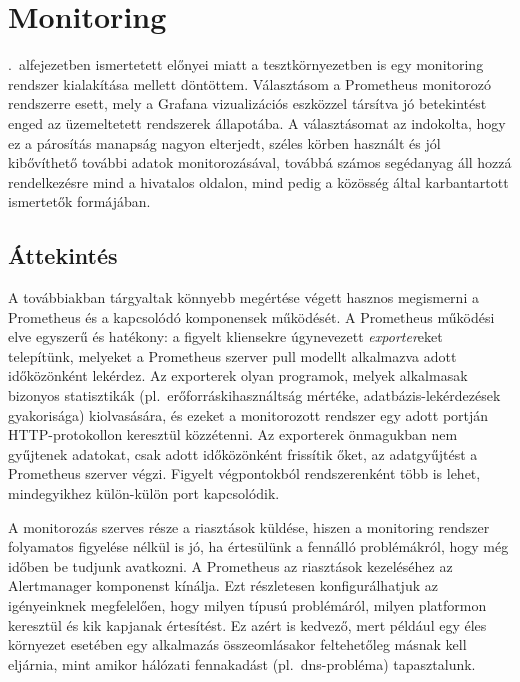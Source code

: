 
\chapter{Monitoring}
.~alfejezetben ismertetett előnyei miatt a tesztkörnyezetben is egy monitoring rendszer kialakítása mellett döntöttem. Választásom a Prometheus monitorozó rendszerre esett, mely a Grafana vizualizációs eszközzel társítva jó betekintést enged az üzemeltetett rendszerek állapotába. A választásomat az indokolta, hogy ez a párosítás manapság nagyon elterjedt, széles körben használt és jól kibővíthető további adatok monitorozásával, továbbá számos segédanyag áll hozzá rendelkezésre mind a hivatalos oldalon, mind pedig a közösség által karbantartott ismertetők formájában.

\section{Áttekintés}
A továbbiakban tárgyaltak könnyebb megértése végett hasznos megismerni a Prometheus és a kapcsolódó komponensek működését. A Prometheus működési elve egyszerű és hatékony: a figyelt kliensekre úgynevezett \textit{exporter}eket telepítünk, melyeket a Prometheus szerver pull modellt alkalmazva adott időközönként lekérdez. Az exporterek olyan programok, melyek alkalmasak bizonyos statisztikák (pl.~erőforráskihasználtság mértéke, adatbázis-lekérdezések gyakorisága) kiolvasására, és ezeket a monitorozott rendszer egy adott portján HTTP-protokollon keresztül közzétenni. Az exporterek önmagukban nem gyűjtenek adatokat, csak adott időközönként frissítik őket, az adatgyűjtést a Prometheus szerver végzi. Figyelt végpontokból rendszerenként több is lehet, mindegyikhez külön-külön port kapcsolódik.

A monitorozás szerves része a riasztások küldése, hiszen a monitoring rendszer folyamatos figyelése nélkül is jó, ha értesülünk a fennálló problémákról, hogy még időben be tudjunk avatkozni. A Prometheus az riasztások kezeléséhez az Alertmanager komponenst kínálja. Ezt részletesen konfigurálhatjuk az igényeinknek megfelelően, hogy milyen típusú problémáról, milyen platformon keresztül és kik kapjanak értesítést. Ez azért is kedvező, mert például egy éles környezet esetében egy alkalmazás összeomlásakor feltehetőleg másnak kell eljárnia, mint amikor hálózati fennakadást (pl.~\acrshort{dns}-probléma) tapasztalunk.

